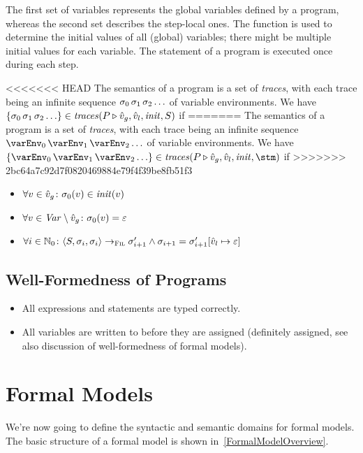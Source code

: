 \documentclass[a4paper,10pt,english]{article}
\begin{document}
The first set of variables represents the global variables defined by a program, whereas the second set describes the step-local
ones. The function is used to determine the initial values of all (global) variables; there might be multiple initial
values for each variable. The statement of a program is executed once during each step.

\begin{samepage}
<<<<<<< HEAD
	The semantics of a \Fil program is a set of \textit{traces}, with each trace being an infinite sequence $\sigma_0 \,
	\sigma_1 \, \sigma_2 \ldots$ of variable environments. We have $\{ \sigma_0 \, \sigma_1 \, \sigma_2 \ldots \}
	\in \mathit{traces}(P \triangleright \hat{v}_g, \hat{v}_l, \mathit{init}, S)$ if
=======
	The semantics of a \Fil program is a set of \textit{traces}, with each trace being an infinite sequence $\varEnv_0 \,
	\varEnv_1 \, \varEnv_2 \ldots$ of variable environments. We have $\{ \varEnv_0 \, \varEnv_1 \, \varEnv_2 \ldots \} \in
	\mathit{traces}(\prog \triangleright \toSet{\var}_g, \toSet{\var}_l, \mathit{init}, \stm)$ if
>>>>>>> 2bc64a7c92d7f0820469884e79f4f39be8fb51f3
	\begin{itemize}
		\item $\forall v \in \hat{v}_g \colon \sigma_0(v) \in \mathit{init}(v)$
		\item $\forall v \in \mathit{Var} \setminus \hat{v}_g \colon \sigma_0(v) = \varepsilon$
		\item $\forall i \in \mathbb{N}_0 \colon \langle S, \sigma_i, \sigma_i \rangle \rightarrow_{\textsc{Fil}}
		\sigma_{i+1}' \wedge \sigma_{i+1} = \sigma_{i + 1}'[\hat{v}_l \mapsto \varepsilon]$
	\end{itemize}
\end{samepage}

\subsection{Well-Formedness of \Fil Programs}
\begin{itemize}
	\item All expressions and statements are typed correctly.
	\item All variables are written to before they are assigned (definitely assigned, see also discussion of well-formedness of
	formal models).
\end{itemize}

\section{Formal Models}
We're now going to define the syntactic and semantic
domains for formal models. The basic structure of a formal model is shown in~\cref{FormalModelOverview}.
\end{document}
